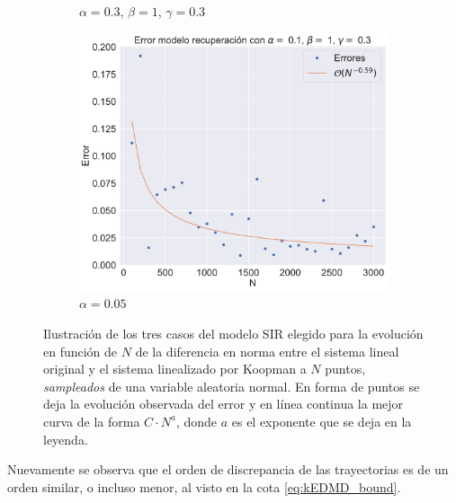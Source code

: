 \begin{figure}[h]
\begin{subfigure}[b]{0.32\textwidth}
        \caption{$\alpha=0.3$, $\beta=1$, $\gamma=0.3$}
    \end{subfigure}
    \hfill
    \begin{subfigure}[b]{0.32\textwidth}
        \centering
        \includegraphics[width=\textwidth]{img/content/chapter3/SIR_rec3Errors.pdf}
        \caption{$\alpha=0.05$}
    \end{subfigure}
    \caption{Ilustración de los tres casos del modelo SIR elegido para la evolución en función de $N$ de la diferencia en norma entre el sistema lineal original y el sistema linealizado por Koopman a $N$ puntos,  \textit{sampleados} de una variable aleatoria normal. En forma de puntos se deja la evolución observada del error y en línea continua la mejor curva de la forma $C \cdot N^{a}$, donde $a$ es el exponente que se deja en la leyenda.}
    \label{fig:ErrorSIR_rec}
\end{figure}
Nuevamente se observa que el orden de discrepancia de las trayectorias es de un orden similar, o incluso menor, al visto en la cota \ref{eq:kEDMD_bound}.